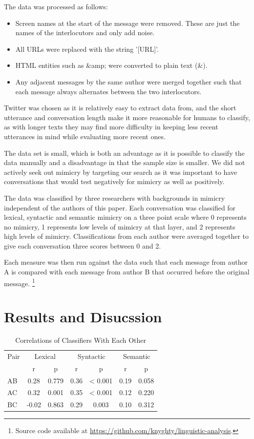 \documentclass[conference]{IEEEtran}
\begin{document}
The data was processed as follows:
\begin{itemize}
	\item Screen names at the start of the message were removed. These are just the names of the 
		  interlocutors and only add noise.
	\item All URLs were replaced with the string '[URL]'.
	\item HTML entities such as \&amp; were converted to plain text (\&).
	\item Any adjacent messages by the same author were merged together such that each message always
	      alternates between the two interlocutors.
\end{itemize}

Twitter was chosen as it is relatively easy to extract data from, and the short utterance and conversation length make it more reasonable for humans to classify, as with longer texts they may find more difficulty in keeping less recent utterances in mind while evaluating more recent ones. 

The data set is small, which is both an advantage as it is possible to classify the data manually and a disadvantage in that the sample size is smaller. We did not actively seek out mimicry by targeting our search as it was important to have conversations that would test negatively for mimicry as well as positively.

The data was classified by three researchers with backgrounds in mimicry independent of the authors of  this paper. Each  conversation was classified for lexical, syntactic and semantic mimicry on a three point scale  where 0 represents no mimicry, 1 represents low levels of mimicry at that layer, and 2 represents high  levels of mimicry. Classifications from each author were averaged together to give each conversation three scores between 0 and 2.

Each measure was then run against the data such that each message from author A is compared with each  message from author B that occurred before the original message. \footnote{Source code available at \url{https://github.com/knyghty/linguistic-analysis}.}


\section{Results and Disucssion}

\begin{table}[!t]
\caption{Correlations of Classifiers With Each Other}
\label{classifiers}
\centering
\renewcommand{\arraystretch}{1.2}
\begin{tabular}{l | c c | c c | c c}
Pair & \multicolumn{2}{|c|}{Lexical} & \multicolumn{2}{|c|}{Syntactic} & \multicolumn{2}{|c}{Semantic} \\
 & r & p & r & p & r & p \\
\hline
AB & 0.28 & 0.779 & 0.36 & < 0.001 & 0.19 & 0.058 \\
AC & 0.32 & 0.001 & 0.35 & < 0.001 & 0.12 & 0.220 \\
BC & -0.02 & 0.863 & 0.29 & 0.003 & 0.10 & 0.312
\end{tabular}
\end{table}
\end{document}
